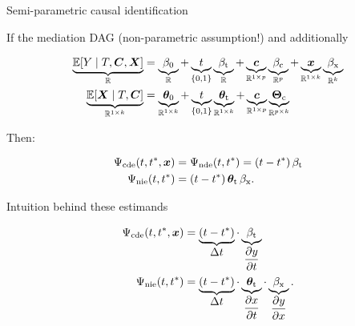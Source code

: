 \documentclass{beamer}
\theoremstyle{remark}
\renewcommand{\c}{\bm c}
\newcommand{\x}{\bm x}
\newcommand{\C}{\bm C}
\newcommand{\X}{\bm X}
\newcommand{\thetazero}{\bm \theta_0}
\newcommand{\thetat}{\bm \theta_\text{t}}
\newcommand{\Thetac}{\bm \Theta_\text{c}}
\newcommand{\betazero}{\beta_0}
\newcommand{\betat}{\beta_\text{t}}
\newcommand{\betac}{\beta_\text{c}}
\newcommand{\betax}{\beta_\text{x}}
\newcommand{\cde}{\Psi_\text{cde} \paren*{t, t^*, \x}}
\newcommand{\nde}{\Psi_\text{nde} \paren*{t, t^*}}
\newcommand{\nie}{\Psi_\text{nie} \paren*{t, t^*}}
\DeclarePairedDelimiter{\paren}{(}{)}
\DeclarePairedDelimiter{\brac}{[}{]}
\newcommand{\E}[2][]{%
   \ifthenelse{ \equal{#1}{} }
      {\ensuremath{\mathbb{E} \brac*{#2}}}
      {\ensuremath{\mathbb{E} \brac*{#2 \mid #1}}}
}
\begin{document}
\begin{frame}{Semi-parametric causal identification}

    If the mediation DAG (non-parametric assumption!) and additionally

    \begin{align*}
        \underbrace{\E[T, \C, \X]{Y}}_{\mathbb R}
         & = \underbrace{\betazero}_{\mathbb R}
        + \underbrace{t}_{\{0, 1\}} \underbrace{\betat}_{\mathbb R}
        + \underbrace{\c}_{\mathbb R^{1 \times p}} \underbrace{\betac}_{\mathbb R^p}
        + \underbrace{\x}_{\mathbb R^{1 \times k}} \underbrace{\betax}_{\mathbb R^k} \\
        \underbrace{\E[T, \C]{\X}}_{\mathbb R^{1 \times k}}
         & = \underbrace{\thetazero}_{\mathbb R^{1 \times k}}
        + \underbrace{t}_{\{0, 1\}} \underbrace{\thetat}_{\mathbb R^{1 \times k}}
        + \underbrace{\c}_{\mathbb R^{1 \times p}} \underbrace{\Thetac}_{\mathbb R^{p \times k}}
    \end{align*}

    Then:

    \begin{align*}
        \cde & = \nde = \paren*{t - t^*} \, \betat      \\
        \nie & = \paren*{t - t^*} \, \thetat \, \betax.
    \end{align*}

\end{frame}

\begin{frame}{Intuition behind these estimands}

    \begin{align*}
        \cde & = \underbrace{\paren*{t - t^*}}_{\displaystyle \Delta t} \cdot \underbrace{\betat}_{\displaystyle \frac{\partial y}{\partial t}}                                                                           \\
        \nie & = \underbrace{\paren*{t - t^*}}_{\displaystyle \Delta t} \cdot \underbrace{\thetat}_{\displaystyle \frac{\partial x}{\partial t}} \cdot \underbrace{\betax}_{\displaystyle \frac{\partial y}{\partial x}}.
    \end{align*}

\end{frame}
\end{document}
